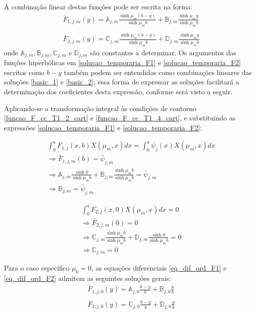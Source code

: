 A combinação linear destas funções pode ser escrita na forma:
\begin{align}
& \bar{F}_{1,j,m}(y) = \mathbb{A}_{j,m}\frac{\sinh\mu_m (b - y)}{\sinh\mu_m b} + \mathbb{B}_{j,m}\frac{\sinh\mu_m y}{\sinh\mu_m b} \label{solucao_temporaria_F1}\\ \nonumber \\
& \bar{F}_{2,j,m}(y) = \mathbb{C}_{j,m}\frac{\sinh\mu_m (b - y)}{\sinh\mu_m b} + \mathbb{D}_{j,m}\frac{\sinh\mu_m y}{\sinh\mu_m b} \label{solucao_temporaria_F2}
\end{align} 
onde $\mathbb{A}_{j,m}, \mathbb{B}_{j,m}, \mathbb{C}_{j,m}$ e $\mathbb{D}_{j,m}$ são constantes a determinar. Os argumentos das funções hiperbólicas em \eqref{solucao_temporaria_F1} e \eqref{solucao_temporaria_F2} escritos como $b - y$ também podem ser entendidos como combinações lineares das soluções \eqref{basic_1} e \eqref{basic_2}; essa forma de expressar as soluções facilitará a determinação dos coeficientes desta expressão, conforme será visto a seguir.

Aplicando-se a transformação integral às condições de contorno \eqref{funcao_F_cc_T1_2_cart} e \eqref{funcao_F_cc_T1_4_cart}, e substituindo as expressões \eqref{solucao_temporaria_F1} e \eqref{solucao_temporaria_F2}:

\begin{align}
& \int_0^a F_{1,j}(x, b)X(\mu_m, x)dx = \int_0^a \psi_j(x) X(\mu_m, x)dx \nonumber \\
& \Rightarrow \bar{F}_{1,j,m}(b) = \bar{\psi}_{j, m} \nonumber \\
& \Rightarrow \mathbb{A}_{j,m}\frac{\sinh 0}{\sinh\mu_m b} + \mathbb{B}_{j,m}\frac{\sinh \mu_m b}{\sinh\mu_m b} = \bar{\psi}_{j, m} \nonumber \\
& \Rightarrow \mathbb{B}_{j,m} = \bar{\psi}_{j, m} \label{resultado_cte_5}
\end{align} 

\begin{align}
& \int_0^a F_{2,j}(x, 0)X(\mu_m, x)dx = 0 \nonumber \\
& \Rightarrow \bar{F}_{2,j,m}(0) = 0 \nonumber \\
& \Rightarrow \mathbb{C}_{j,m}\frac{\sinh\mu_m b}{\sinh\mu_m b} + \mathbb{D}_{j,m}\frac{\sinh 0}{\sinh\mu_m b} = 0 \nonumber \\
& \Rightarrow \mathbb{C}_{j,m} = 0 \label{resultado_cte_8}
\end{align} 

Para o caso específico $\mu_0 = 0$, as equações diferenciais \eqref{eq_dif_ord_F1} e \eqref{eq_dif_ord_F2} admitem as seguintes soluções gerais:
\begin{align}
& \bar{F}_{1,j,0}(y) = \mathbb{A}_{j,0}\frac{b - y}{b} + \mathbb{B}_{j,0}\frac{y}{b} \label{solucao_temporaria_F1_0}\\ \nonumber \\
& \bar{F}_{2,j,0}(y) = \mathbb{C}_{j,0}\frac{b - y}{b} + \mathbb{D}_{j,0}\frac{y}{b} \label{solucao_temporaria_F2_0}
\end{align} 

